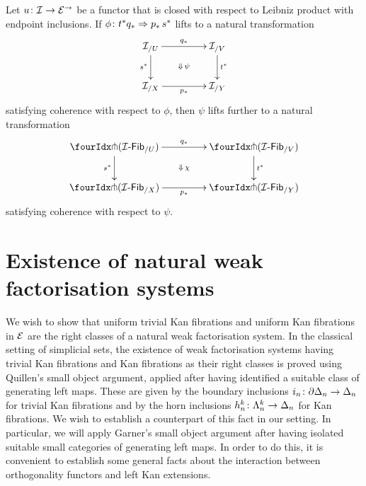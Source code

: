 \documentclass[reqno,10pt,a4paper,oneside,draft]{amsart}
\begin{document}
\begin{corollary}
Let $u \co \cal{I} \to \cal{E}^\to$ be a functor that is closed with respect to Leibniz product with endpoint
inclusions. If  $\phi \co t^* q_* \Rightarrow p_* \, s^*$ lifts to a natural transformation 
\[
\xymatrix@C+2em{
  \cal{I}_{/U}
  \ar[r]^{q_*} 
  \ar[d]_{s^*}
  \ar@{}[dr]|{\Downarrow \, \psi}
&
  \cal{I}_{/V}
  \ar[d]^{t^*}
\\
  \cal{I}_{/X}
  \ar[r]_{p_*} 
&
  \cal{I}_{/Y}
}
\]
satisfying coherence with respect to $\phi$, then $\psi$ lifts further to a natural transformation
\[
\xymatrix@C+2em{
  \liftl{(\Fib{\cal{I}}_{/U})}
  \ar[r]^{q_*} 
  \ar[d]_{s^*}
  \ar@{}[dr]|{\Downarrow \, \chi}
&
  \liftl{(\Fib{\cal{I}}_{/V})}
  \ar[d]^{t^*}
\\
  \liftl{(\Fib{\cal{I}}_{/X})}
  \ar[r]_{p_*} 
&
  \liftl{(\Fib{\cal{I}}_{/Y})}
}
\]
satisfying coherence with respect to $\psi$.
\end{corollary} 


\section{Existence of natural weak factorisation systems}
\label{sec:exinwf}

We wish to show that uniform trivial Kan fibrations and uniform Kan fibrations in $\cal{E}$ are the right classes of a natural weak factorisation system.
In the classical setting of simplicial sets, the existence of weak factorisation systems having trivial Kan fibrations and Kan fibrations as their right classes is proved using Quillen's small object argument, applied after having identified a suitable class of generating left maps.
These are given by the boundary inclusions $i_n \co \partial \Delta_n \to \Delta_n$ for trivial Kan fibrations and by the horn inclusions $h^k_n \co \Lambda^k_n \to \Delta_n$ for Kan fibrations.
We wish to establish a counterpart of this fact in our setting.
In particular, we will apply Garner's small object argument after having isolated suitable small categories of generating left maps.
In order to do this, it is convenient to establish some general facts about the interaction between orthogonality functors and left Kan extensions.
\end{document}
